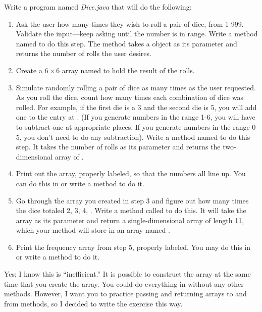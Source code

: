 \begin{exercise}
Write a program named {\em Dice.java} that will do the following:

\begin{enumerate}

\item Ask the user how many times they wish to roll a pair of dice, from 1-999. Validate the input---keep asking until the number is in range. Write a method named  to do this step. The method takes a  object as its parameter and returns the number of rolls the user desires.

\item Create a $6 \times 6$ array named  to hold the result of the rolls.

\item Simulate randomly rolling a pair of dice as many times as the user requested. As you roll the dice, count how many times each combination of dice was rolled. For example, if the first die is a 3 and the second die is 5, you will add one to the entry at . (If you generate numbers in the range 1-6, you will have to subtract one at appropriate places. If you generate numbers in the range 0-5, you don't need to do any subtraction). Write a method named  to do this step. It takes the number of rolls as its parameter and returns the two-dimensional array of .

\item Print out the array, properly labeled, so that the numbers all line up. You can do this in  or write a method to do it.

\item Go through the array you created in step 3 and figure out how many times the dice totaled 2, 3, 4, . Write a method called  to do this. It will take the  array as its parameter and return a single-dimensional array of length 11, which your  method will store in an array named .

\item Print the frequency array from step 5, properly labeled. You may do this in  or write a method to do it.

\end{enumerate}

Yes; I know this is ``inefficient.'' It is possible to construct the  array at the same time that you create the  array. You could do everything in  without any other methods. However, I want you to practice passing and returning arrays to and from methods, so I decided to write the exercise this way.


\end{exercise}
